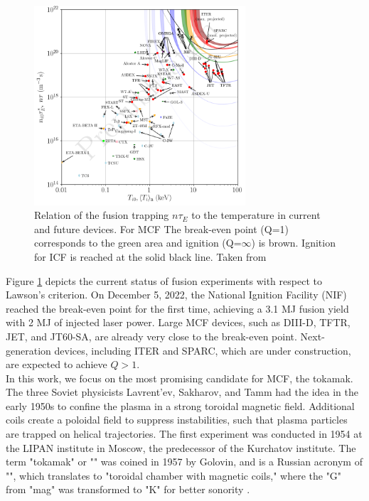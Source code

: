 \begin{figure}[H]
	\centering
	\includegraphics[width=0.7\textwidth]{schemes/Fusion_Triples_2021.png}
	\caption[Relation of the fusion trapping $n\tau_E$ to the temperature in current and future devices]{Relation of the fusion trapping $n\tau_E$ to the temperature in current and future devices. For MCF The break-even point (Q=1) corresponds to the green area and ignition (Q=$\infty$) is brown. Ignition for ICF is reached at the solid black line. Taken from \cite{wurzel2022progress}}
	\label{fig:Intro_fusionTripleProduct}
\end{figure}

Figure \ref{fig:Intro_fusionTripleProduct} depicts the current status of fusion experiments with respect to Lawson's criterion. On December 5, 2022, the National Ignition Facility (NIF) reached the break-even point for the first time, achieving a 3.1 MJ fusion yield with 2 MJ of injected laser power\cite{abu2024achievement}. Large MCF devices, such as DIII-D, TFTR, JET, and JT60-SA, are already very close to the break-even point. Next-generation devices, including ITER and SPARC, which are under construction, are expected to achieve $Q>1$. \\


In this work, we focus on the most promising candidate for MCF, the tokamak. The three Soviet physicists Lavrent'ev, Sakharov, and Tamm had the idea in the early 1950s \cite{azizov2012tokamaks} to confine the plasma in a strong toroidal magnetic field. Additional coils create a poloidal field to suppress instabilities, such that plasma particles are trapped on helical trajectories. The first experiment was conducted in 1954 at the LIPAN institute in Moscow, the predecessor of the Kurchatov institute. The term "tokamak" or "" was coined in 1957 by Golovin, and is a Russian acronym of "", which translates to "toroidal chamber with magnetic coils," where the "G" from "mag" was transformed to "K" for better sonority \cite{shafranov1999trends}. \\

